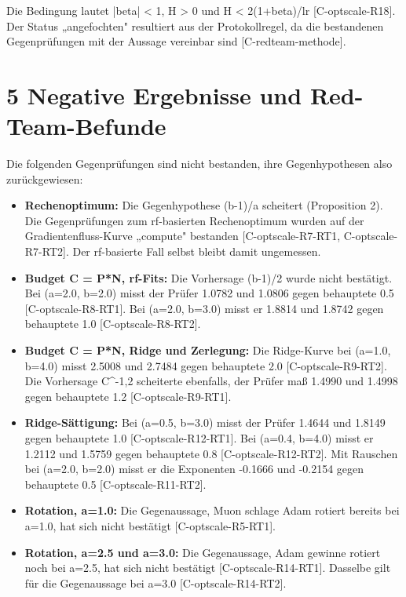 \documentclass[10pt,twocolumn]{article}
\begin{document}
Die Bedingung lautet |beta| < 1, H > 0 und H < 2(1+beta)/lr {\scriptsize[C-optscale-R18]}. Der Status „angefochten" resultiert aus der Protokollregel, da die bestandenen Gegenprüfungen mit der Aussage vereinbar sind {\scriptsize[C-redteam-methode]}.

\section{5 Negative Ergebnisse und Red-Team-Befunde}

Die folgenden Gegenprüfungen sind nicht bestanden, ihre Gegenhypothesen also zurückgewiesen:

\begin{itemize}
\item \textbf{Rechenoptimum:} Die Gegenhypothese (b-1)/a scheitert (Proposition 2). Die Gegenprüfungen zum rf-basierten Rechenoptimum wurden auf der Gradientenfluss-Kurve „compute" bestanden {\scriptsize[C-optscale-R7-RT1, C-optscale-R7-RT2]}. Der rf-basierte Fall selbst bleibt damit ungemessen.
\item \textbf{Budget C = P*N, rf-Fits:} Die Vorhersage (b-1)/2 wurde nicht bestätigt. Bei (a=2.0, b=2.0) misst der Prüfer 1.0782 und 1.0806 gegen behauptete 0.5 {\scriptsize[C-optscale-R8-RT1]}. Bei (a=2.0, b=3.0) misst er 1.8814 und 1.8742 gegen behauptete 1.0 {\scriptsize[C-optscale-R8-RT2]}.
\item \textbf{Budget C = P*N, Ridge und Zerlegung:} Die Ridge-Kurve bei (a=1.0, b=4.0) misst 2.5008 und 2.7484 gegen behauptete 2.0 {\scriptsize[C-optscale-R9-RT2]}. Die Vorhersage C^-1,2 scheiterte ebenfalls, der Prüfer maß 1.4990 und 1.4998 gegen behauptete 1.2 {\scriptsize[C-optscale-R9-RT1]}.
\item \textbf{Ridge-Sättigung:} Bei (a=0.5, b=3.0) misst der Prüfer 1.4644 und 1.8149 gegen behauptete 1.0 {\scriptsize[C-optscale-R12-RT1]}. Bei (a=0.4, b=4.0) misst er 1.2112 und 1.5759 gegen behauptete 0.8 {\scriptsize[C-optscale-R12-RT2]}. Mit Rauschen bei (a=2.0, b=2.0) misst er die Exponenten -0.1666 und -0.2154 gegen behauptete 0.5 {\scriptsize[C-optscale-R11-RT2]}.
\item \textbf{Rotation, a=1.0:} Die Gegenaussage, Muon schlage Adam rotiert bereits bei a=1.0, hat sich nicht bestätigt {\scriptsize[C-optscale-R5-RT1]}.
\item \textbf{Rotation, a=2.5 und a=3.0:} Die Gegenaussage, Adam gewinne rotiert noch bei a=2.5, hat sich nicht bestätigt {\scriptsize[C-optscale-R14-RT1]}. Dasselbe gilt für die Gegenaussage bei a=3.0 {\scriptsize[C-optscale-R14-RT2]}.

\end{itemize}
\end{document}
